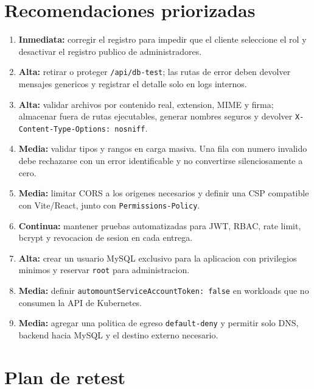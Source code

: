 \section{Recomendaciones priorizadas}

\begin{enumerate}
  \item \textbf{Inmediata:} corregir el registro para impedir que el cliente
  seleccione el rol y desactivar el registro publico de administradores.

  \item \textbf{Alta:} retirar o proteger \texttt{/api/db-test}; las rutas de
  error deben devolver mensajes genericos y registrar el detalle solo en logs
  internos.

  \item \textbf{Alta:} validar archivos por contenido real, extension, MIME y
  firma; almacenar fuera de rutas ejecutables, generar nombres seguros y
  devolver \texttt{X-Content-Type-Options: nosniff}.

  \item \textbf{Media:} validar tipos y rangos en carga masiva. Una fila con
  numero invalido debe rechazarse con un error identificable y no convertirse
  silenciosamente a cero.

  \item \textbf{Media:} limitar CORS a los origenes necesarios y definir una
  CSP compatible con Vite/React, junto con \texttt{Permissions-Policy}.

  \item \textbf{Continua:} mantener pruebas automatizadas para JWT, RBAC,
  rate limit, bcrypt y revocacion de sesion en cada entrega.

  \item \textbf{Alta:} crear un usuario MySQL exclusivo para la aplicacion
  con privilegios minimos y reservar \texttt{root} para administracion.

  \item \textbf{Media:} definir \texttt{automountServiceAccountToken: false}
  en workloads que no consumen la API de Kubernetes.

  \item \textbf{Media:} agregar una politica de egreso \texttt{default-deny}
  y permitir solo DNS, backend hacia MySQL y el destino externo necesario.
\end{enumerate}

\section{Plan de retest}

